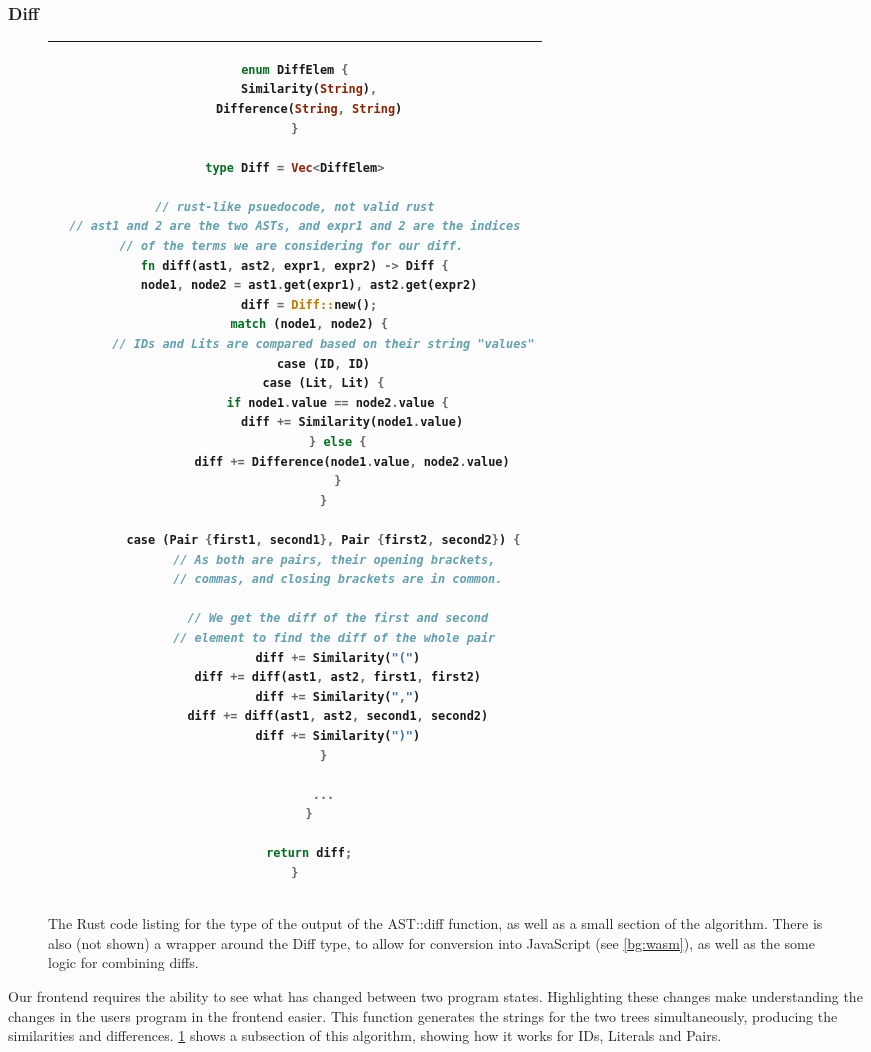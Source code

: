 \subsubsection{Diff}
\begin{figure}[t]
    \centering
    \begin{tabular}{|c|}
        \hline
    \begin{lstlisting}[language=Rust]
enum DiffElem {
    Similarity(String),
    Difference(String, String)
}

type Diff = Vec<DiffElem>

// rust-like psuedocode, not valid rust
// ast1 and 2 are the two ASTs, and expr1 and 2 are the indices
// of the terms we are considering for our diff. 
fn diff(ast1, ast2, expr1, expr2) -> Diff {
    node1, node2 = ast1.get(expr1), ast2.get(expr2)
    diff = Diff::new();
    match (node1, node2) {
        // IDs and Lits are compared based on their string "values"
        case (ID, ID)
        case (Lit, Lit) {
            if node1.value == node2.value {
                diff += Similarity(node1.value)
            } else {
                diff += Difference(node1.value, node2.value)
            }
        }

        case (Pair {first1, second1}, Pair {first2, second2}) {
            // As both are pairs, their opening brackets, 
            // commas, and closing brackets are in common.

            // We get the diff of the first and second
            // element to find the diff of the whole pair 
            diff += Similarity("(")
            diff += diff(ast1, ast2, first1, first2)
            diff += Similarity(",")
            diff += diff(ast1, ast2, second1, second2)
            diff += Similarity(")")
        }

        ...
    }
    
    return diff;
}
    \end{lstlisting}
    \\\hline
    \end{tabular}
    \caption{The Rust code listing for the type of the output of the AST::diff function, as well as a small section of the algorithm. There is also (not shown) a wrapper around the Diff type, to allow for conversion into JavaScript (see \ref{bg:wasm}), as well as the some logic for combining diffs.}
    \label{fig:diff_list}
\end{figure}

\label{paragraph:diff} Our frontend requires the ability to see what has changed between two program states. Highlighting these changes make understanding the changes in the users program in the frontend easier. This function generates the strings for the two trees simultaneously, producing the similarities and differences. \ref{fig:diff_list} shows a subsection of this algorithm, showing how it works for IDs, Literals and Pairs.

